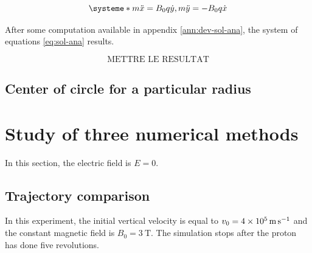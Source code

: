 \documentclass[a4paper,12pt,twoside]{article}
\begin{document}
\begin{equation}
\systeme*{m\ddot{x} = B_0q\dot{y}, m\ddot{y} = - B_0q\dot{x}}
\label{eq:equa-diff-simple}
\end{equation}

After some computation available in appendix \ref{ann:dev-sol-ana}, the system of equations \ref{eq:sol-ana} results.

\begin{equation}
\text{METTRE LE RESULTAT}
\label{eq:sol-ana}
\end{equation}%

\subsection{Center of circle for a particular radius}

\section{Study of three numerical methods}
In this section, the electric field is $E = 0$.
\subsection{Trajectory comparison}
In this experiment, the initial vertical velocity is equal to $v_0 = \SI{4d5}{\meter\per\second}$ and the constant magnetic field is $B_0 = \SI{3}{\tesla}$.
The simulation stops after the proton has done five revolutions.
\end{document}
